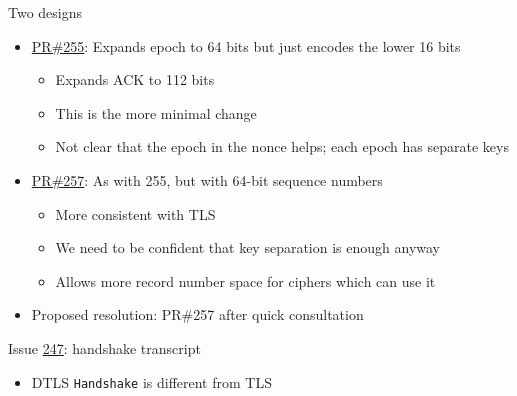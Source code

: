 \documentclass[helvetica]{beamer}
\begin{document}
\begin{frame}{Two designs}

  \begin{itemize}
  \item \href{https://github.com/tlswg/dtls13-spec/pull/255}{PR\#255}: 
    Expands epoch to 64 bits but just encodes the lower 16 bits
      \begin{itemize}
      \item Expands ACK to 112 bits        
      \item This is the more minimal change
      \item Not clear that the epoch in the nonce helps; each epoch has separate keys
      \end{itemize}

    \item \href{https://github.com/tlswg/dtls13-spec/pull/257}{PR\#257}:
        As with 255, but with 64-bit sequence numbers
        \begin{itemize}
        \item More consistent with TLS
        \item We need to be confident that key separation is enough anyway
        \item Allows more record number space for ciphers which can use it
        \end{itemize}
      \item Proposed resolution: PR\#257 after quick consultation
    \end{itemize}
\end{frame}                             


\begin{frame}{Issue \href{https://github.com/tlswg/dtls13-spec/issues/247}{247}: handshake transcript}
  
  \begin{itemize}
  \item DTLS \texttt{Handshake} is different from TLS
  \end{itemize}


\end{frame}
\end{document}

